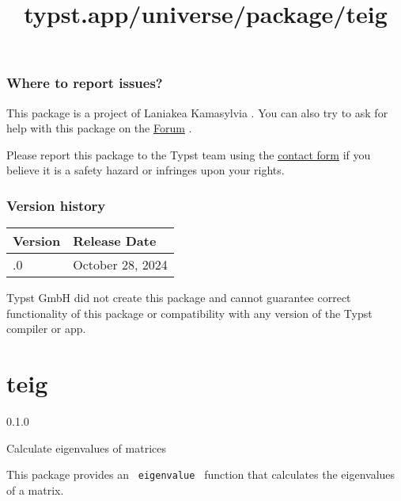 \subsubsection{Where to report issues?}\label{where-to-report-issues}

This package is a project of Laniakea Kamasylvia . You can also try to
ask for help with this package on the
\href{https://forum.typst.app}{Forum} .

Please report this package to the Typst team using the
\href{https://typst.app/contact}{contact form} if you believe it is a
safety hazard or infringes upon your rights.

\label{versions}
\subsubsection{Version history}\label{version-history}

\begin{longtable}[]{@{}ll@{}}
\toprule\noalign{}
Version & Release Date \\
\midrule\noalign{}
\endhead
\bottomrule\noalign{}
\endlastfoot
0.1.0 & October 28, 2024 \\
\end{longtable}

Typst GmbH did not create this package and cannot guarantee correct
functionality of this package or compatibility with any version of the
Typst compiler or app.


\title{typst.app/universe/package/teig}

\label{banner}
\section{teig}\label{teig}

{ 0.1.0 }

Calculate eigenvalues of matrices

\label{readme}
This package provides an \texttt{\ eigenvalue\ } function that
calculates the eigenvalues of a matrix.

\begin{Shaded}
\begin{Highlighting}[]

\NormalTok{)}


\NormalTok{$}
\NormalTok{$}

\NormalTok{$}
\NormalTok{$}
\end{Highlighting}
\end{Shaded}

